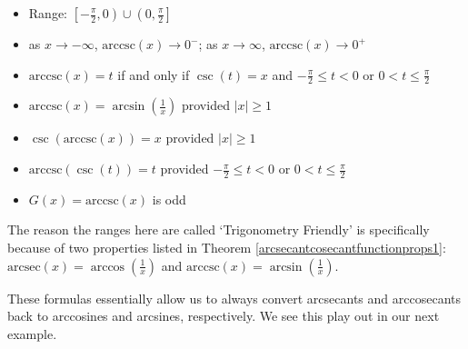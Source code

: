 {\begin{thm}
\begin{itemize}
\begin{itemize}
\item Range:  $\left[-\frac{\pi}{2}, 0 \right) \cup \left(0, \frac{\pi}{2} \right]$

\item  as $x \rightarrow -\infty$, $\mbox{arccsc}(x) \rightarrow 0^{-}$;  as $x \rightarrow \infty$, $\mbox{arccsc}(x) \rightarrow 0^{+}$

\item  $\mbox{arccsc}(x) = t$ if and only if $\csc(t) = x$ and $-\frac{\pi}{2} \leq t < 0$ or $0 < t \leq \frac{\pi}{2}$

\item  $\mbox{arccsc}(x) = \arcsin\left(\frac{1}{x}\right)$ provided $|x| \geq 1$

\item  $\csc\left(\mbox{arccsc}(x)\right) = x$ provided $|x| \geq 1$

\item  $\mbox{arccsc}(\csc(t)) = t$ provided $-\frac{\pi}{2} \leq t < 0$ or $0 < t \leq \frac{\pi}{2}$

\item  $G(x) = \mbox{arccsc}(x)$ is odd

\end{itemize}

\end{itemize}

\end{thm}

\smallskip

\ebm}

\smallskip

The reason the ranges here are called `Trigonometry Friendly' is specifically because of two properties listed in Theorem \ref{arcsecantcosecantfunctionprops1}:   $\mbox{arcsec}(x) = \arccos\left(\frac{1}{x}\right)$ and $\mbox{arccsc}(x) = \arcsin\left(\frac{1}{x}\right)$.  

\smallskip

These formulas essentially  allow us to always convert arcsecants and arccosecants back to arccosines and arcsines, respectively.  We see this play out in our next example.

